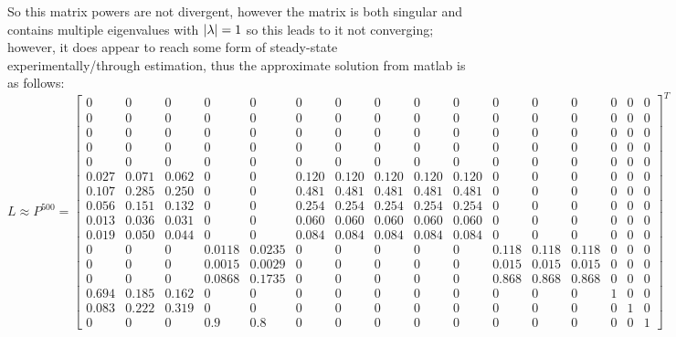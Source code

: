 \documentclass[]{article}
\begin{document}
So this matrix powers are not divergent, however the matrix is both singular and contains multiple eigenvalues with $\abs{\lambda} = 1$ so this leads to it not converging; however, it does appear to reach some form of steady-state experimentally/through estimation, thus the approximate solution from matlab is as follows:
\[
    L \approx P^{500} = \left[ \begin{array}{rrrrrrrrrrrrrrrr}
    0     & 0     & 0     & 0      & 0      & 0     & 0     & 0     & 0     & 0     & 0     & 0     & 0     & 0 & 0 & 0 \\
    0     & 0     & 0     & 0      & 0      & 0     & 0     & 0     & 0     & 0     & 0     & 0     & 0     & 0 & 0 & 0 \\
    0     & 0     & 0     & 0      & 0      & 0     & 0     & 0     & 0     & 0     & 0     & 0     & 0     & 0 & 0 & 0 \\
    0     & 0     & 0     & 0      & 0      & 0     & 0     & 0     & 0     & 0     & 0     & 0     & 0     & 0 & 0 & 0 \\
    0     & 0     & 0     & 0      & 0      & 0     & 0     & 0     & 0     & 0     & 0     & 0     & 0     & 0 & 0 & 0 \\
    0.027 & 0.071 & 0.062 & 0      & 0      & 0.120 & 0.120 & 0.120 & 0.120 & 0.120 & 0     & 0     & 0     & 0 & 0 & 0 \\
    0.107 & 0.285 & 0.250 & 0      & 0      & 0.481 & 0.481 & 0.481 & 0.481 & 0.481 & 0     & 0     & 0     & 0 & 0 & 0 \\
    0.056 & 0.151 & 0.132 & 0      & 0      & 0.254 & 0.254 & 0.254 & 0.254 & 0.254 & 0     & 0     & 0     & 0 & 0 & 0 \\
    0.013 & 0.036 & 0.031 & 0      & 0      & 0.060 & 0.060 & 0.060 & 0.060 & 0.060 & 0     & 0     & 0     & 0 & 0 & 0 \\
    0.019 & 0.050 & 0.044 & 0      & 0      & 0.084 & 0.084 & 0.084 & 0.084 & 0.084 & 0     & 0     & 0     & 0 & 0 & 0 \\
    0     & 0     & 0     & 0.0118 & 0.0235 & 0     & 0     & 0     & 0     & 0     & 0.118 & 0.118 & 0.118 & 0 & 0 & 0 \\
    0     & 0     & 0     & 0.0015 & 0.0029 & 0     & 0     & 0     & 0     & 0     & 0.015 & 0.015 & 0.015 & 0 & 0 & 0 \\
    0     & 0     & 0     & 0.0868 & 0.1735 & 0     & 0     & 0     & 0     & 0     & 0.868 & 0.868 & 0.868 & 0 & 0 & 0 \\
    0.694 & 0.185 & 0.162 & 0      & 0      & 0     & 0     & 0     & 0     & 0     & 0     & 0     & 0     & 1 & 0 & 0 \\
    0.083 & 0.222 & 0.319 & 0      & 0      & 0     & 0     & 0     & 0     & 0     & 0     & 0     & 0     & 0 & 1 & 0 \\
    0     & 0     & 0     & 0.9    & 0.8    & 0     & 0     & 0     & 0     & 0     & 0     & 0     & 0     & 0 & 0 & 1
    \end{array}\right]^T
\]
\end{document}
